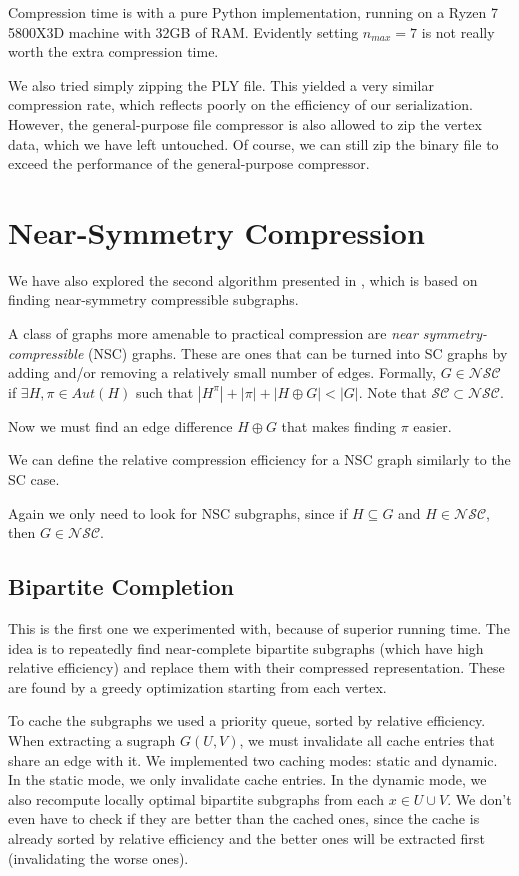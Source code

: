 \documentclass{egpubl}
\begin{document}
Compression time is with a pure Python implementation, running on a Ryzen 7 5800X3D machine with 32GB of RAM. Evidently setting $n_{max} = 7$ is not really worth the extra compression time.

We also tried simply zipping the PLY file. This yielded a very similar compression rate, which reflects poorly on the efficiency of our serialization. However, the general-purpose file compressor is also allowed to zip the vertex data, which we have left untouched. Of course, we can still zip the binary file to exceed the performance of the general-purpose compressor.

\section{Near-Symmetry Compression}

We have also explored the second algorithm presented in \cite{cibej2021automorphisms}, which is based on finding near-symmetry compressible subgraphs.

A class of graphs more amenable to practical compression are \textit{near symmetry-compressible} (NSC) graphs. These are ones that can be turned into SC graphs by adding and/or removing a relatively small number of edges.
Formally, $G \in \mathcal{N}\mathcal{S}\mathcal{C}$ if $\exists H, \pi \in Aut(H)$ such that $|H^\pi| + |\pi| + |H \oplus G| < |G|$. Note that $\mathcal{S}\mathcal{C} \subset \mathcal{N}\mathcal{S}\mathcal{C}$.

Now we must find an edge difference $H \oplus G$ that makes finding $\pi$ easier.

We can define the relative compression efficiency for a NSC graph similarly to the SC case.

Again we only need to look for NSC subgraphs, since
if $H \subseteq G$ and $H \in \mathcal{N}\mathcal{S}\mathcal{C}$, then $G \in \mathcal{N}\mathcal{S}\mathcal{C}$.

\subsection{Bipartite Completion}

This is the first one we experimented with, because of superior running time.
The idea is to repeatedly find near-complete bipartite subgraphs (which have high relative efficiency) and replace them with their compressed representation. These are found by a greedy optimization starting from each vertex.

To cache the subgraphs we used a priority queue, sorted by relative efficiency. When extracting a sugraph $G(U,V)$, we must invalidate all cache entries that share an edge with it. 
We implemented two caching modes: static and dynamic. In the static mode, we only invalidate cache entries. In the dynamic mode, we also recompute locally optimal bipartite subgraphs from each $x \in U \cup V$. We don't even have to check if they are better than the cached ones, since the cache is already sorted by relative efficiency and the better ones will be extracted first (invalidating the worse ones).
\end{document}
